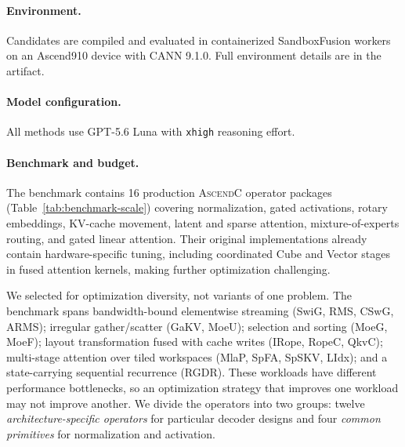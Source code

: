 \documentclass[acmsmall,screen,review,anonymous,nonacm]{acmart}
\newcommand{\ascendc}{\textsc{AscendC}\xspace}
\newcommand{\numkernels}{16\xspace}
\begin{document}
\vspace{-3pt}
\paragraph*{Environment.}
Candidates are compiled and evaluated in containerized SandboxFusion workers on an
Ascend910 device with CANN 9.1.0. Full environment details are in the artifact.

\vspace{-3pt}
\paragraph*{Model configuration.}
All methods use GPT-5.6 Luna with \texttt{xhigh} reasoning effort.

\vspace{-3pt}
\paragraph*{Benchmark and budget.}
The benchmark contains \numkernels production \ascendc operator packages
(Table~\ref{tab:benchmark-scale}) covering normalization, gated activations, rotary embeddings,
KV-cache movement, latent and sparse attention, mixture-of-experts routing, and gated linear attention.
Their original implementations already contain hardware-specific tuning, including coordinated Cube and Vector stages in fused
attention kernels, making further optimization challenging.

We selected for optimization diversity, not variants of one problem. The benchmark spans
bandwidth-bound elementwise streaming (\textsf{SwiG}, \textsf{RMS}, \textsf{CSwG}, \textsf{ARMS});
irregular gather/scatter (\textsf{GaKV}, \textsf{MoeU}); selection and sorting (\textsf{MoeG},
\textsf{MoeF}); layout transformation fused with cache writes (\textsf{IRope}, \textsf{RopeC},
\textsf{QkvC}); multi-stage attention over tiled workspaces (\textsf{MlaP}, \textsf{SpFA},
\textsf{SpSKV}, \textsf{LIdx}); and a state-carrying sequential recurrence (\textsf{RGDR}). These workloads
have different performance bottlenecks, so an optimization strategy that improves one workload may
not improve another.
We divide the operators into two groups: twelve \emph{architecture-specific operators} for particular
decoder designs and four \emph{common primitives} for normalization and activation. 
\end{document}
